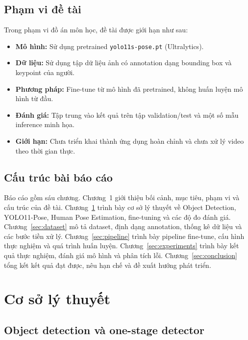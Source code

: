 \documentclass[12pt, a4paper]{article}
\begin{document}
\subsection{Phạm vi đề tài}
Trong phạm vi đồ án môn học, đề tài được giới hạn như sau:
\begin{itemize}[nosep]
  \item \textbf{Mô hình:} Sử dụng pretrained \texttt{yolo11s-pose.pt} (Ultralytics).
  \item \textbf{Dữ liệu:} Sử dụng tập dữ liệu ảnh có annotation dạng bounding box và keypoint của người.
  \item \textbf{Phương pháp:} Fine-tune từ mô hình đã pretrained, không huấn luyện mô hình từ đầu.
  \item \textbf{Đánh giá:} Tập trung vào kết quả trên tập validation/test và một số mẫu inference minh họa.
  \item \textbf{Giới hạn:} Chưa triển khai thành ứng dụng hoàn chỉnh và chưa xử lý video theo thời gian thực.
\end{itemize}

\subsection{Cấu trúc bài báo cáo}
Báo cáo gồm sáu chương.
Chương~1 giới thiệu bối cảnh, mục tiêu, phạm vi và cấu trúc của đề tài.
Chương~\ref{sec:theory} trình bày cơ sở lý thuyết về Object Detection, YOLO11-Pose, Human Pose Estimation, fine-tuning và các độ đo đánh giá.
Chương~\ref{sec:dataset} mô tả dataset, định dạng annotation, thống kê dữ liệu và các bước tiền xử lý.
Chương~\ref{sec:pipeline} trình bày pipeline fine-tune, cấu hình thực nghiệm và quá trình huấn luyện.
Chương~\ref{sec:experiments} trình bày kết quả thực nghiệm, đánh giá mô hình và phân tích lỗi.
Chương~\ref{sec:conclusion} tổng kết kết quả đạt được, nêu hạn chế và đề xuất hướng phát triển.

\section{Cơ sở lý thuyết}
\label{sec:theory}

\subsection{Object detection và one-stage detector}
\end{document}
